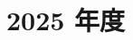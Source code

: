 \documentclass[../../hsm_tok_a.tex]{subfiles}
\begin{document}
    \section{2025 年度}

    

    \clearpage

    
\end{document}
